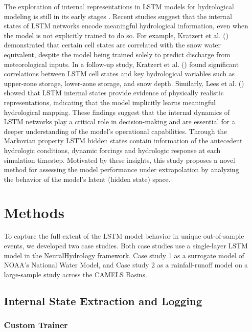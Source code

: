 \documentclass{article}
\begin{document}
The exploration of internal representations in LSTM models for hydrological modeling is still in its early stages \cite{Lees2021}. Recent studies suggest that the internal states of LSTM networks encode meaningful hydrological information, even when the model is not explicitly trained to do so. For example, Kratzert et al. (\cite{Kratzert2018lstm}) demonstrated that certain cell states are correlated with the snow water equivalent, despite the model being trained solely to predict discharge from meteorological inputs. In a follow-up study, Kratzert et al. (\cite{Kratzert2019universal}) found significant correlations between LSTM cell states and key hydrological variables such as upper-zone storage, lower-zone storage, and snow depth. Similarly, Lees et al. (\cite{Lees2021}) showed that LSTM internal states provide evidence of physically realistic representations, indicating that the model implicitly learns meaningful hydrological mapping. These findings suggest that the internal dynamics of LSTM networks play a critical role in decision-making and are essential for a deeper understanding of the model’s operational capabilities. Through the Markovian property LSTM hidden states contain information of the antecedent hydrologic conditions, dynamic forcings and hydrologic response at each simulation timestep. Motivated by these insights, this study proposes a novel method for assessing the model performance under extrapolation by analyzing the behavior of the model’s latent (hidden state) space.

\section{Methods}
\label{sec:methods}

To capture the full extent of the LSTM model behavior in unique out-of-sample events, we developed two case studies. Both case studies use a single-layer LSTM model in the NeuralHydrology framework\cite{Kratzert2022open}. Case study 1 as a surrogate model of NOAA's National Water Model, and Case study 2 as a rainfall-runoff model on a large-sample study across the CAMELS Basins.

\subsection{Internal State Extraction and Logging}

\subsubsection{Custom Trainer}
\end{document}
